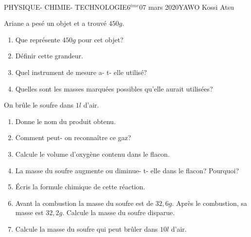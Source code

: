 \documentclass[12pt,a4paper]{book}
\newcommand{\prof}{YAWO Kossi Atsu}
\newcommand{\matiere}{\\PHYSIQUE- CHIMIE- TECHNOLOGIE}
\newcommand{\classe}{6$^{ème}$}
\begin{document}
\begin{td}{\matiere}{\classe}{07 mars 2020}{\prof}
\begin{exo}
Ariane a pesé un objet et a trouvé $450g$.
\begin{enumerate}
\item Que représente $450g$ pour cet objet?
\item Définir cette grandeur.
\item Quel instrument de mesure a- t- elle utilisé?
\item Quelles sont les masses marquées possibles qu'elle aurait utilisées?
\end{enumerate}
\end{exo}

\vspace{0.2cm}

\begin{exo}
On brûle le soufre dans $1l$ d'air.
\begin{enumerate}
\item Donne le nom du produit obtenu.
\item Comment peut- on reconnaître ce gaz?
\item Calcule le volume d'oxygène contenu dans le flacon.
\item La masse du soufre augmente ou diminue- t- elle dans le flacon? Pourquoi?
\item Écris la formule chimique de cette réaction.
\item Avant la combustion la masse du soufre est de $32,6g$. Après le combustion, sa masse est $32,2g$. Calcule la masse du soufre disparue.
\item Calcule la masse du soufre qui peut brûler dans $10l$ d'air.
\end{enumerate}
\end{exo}
\end{td}
\end{document}
